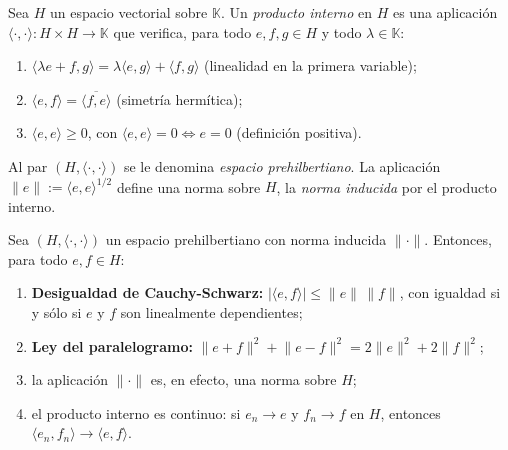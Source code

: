 \begin{Definicion}
\label{ch:preliminares:def:productoInterno}

Sea $H$ un espacio vectorial sobre $\mathbb{K}$. Un \textit{producto interno} en
$H$ es una aplicación $\langle \cdot, \cdot \rangle : H \times H \rightarrow \mathbb{K}$
que verifica, para todo $e, f, g \in H$ y todo $\lambda \in \mathbb{K}$:

\begin{enumerate}
    \item $\langle \lambda e + f, g \rangle = \lambda \langle e, g \rangle + \langle f, g \rangle$ (linealidad en la primera variable);
    \item $\langle e, f \rangle = \overline{\langle f, e \rangle}$ (simetría hermítica);
    \item $\langle e, e \rangle \geq 0$, con $\langle e, e \rangle = 0 \iff e = 0$ (definición positiva).
\end{enumerate}

Al par $(H, \langle \cdot, \cdot \rangle)$ se le denomina \textit{espacio
prehilbertiano}. La aplicación $\lVert e \rVert := \langle e, e \rangle^{1/2}$
define una norma sobre $H$, la \textit{norma inducida} por el producto interno.
\end{Definicion}

\begin{Proposicion}
\label{ch:preliminares:prop:propProductoInterno}

Sea $(H, \langle \cdot, \cdot \rangle)$ un espacio prehilbertiano con norma
inducida $\lVert \cdot \rVert$. Entonces, para todo $e, f \in H$:

\begin{enumerate}
    \item \textbf{Desigualdad de Cauchy-Schwarz:} $|\langle e, f \rangle| \leq \lVert e \rVert \, \lVert f \rVert$, con igualdad si y sólo si $e$ y $f$ son linealmente dependientes;

    \item \textbf{Ley del paralelogramo:} $\lVert e + f \rVert^2 + \lVert e - f \rVert^2 = 2\lVert e \rVert^2 + 2\lVert f \rVert^2$;

    \item la aplicación $\lVert \cdot \rVert$ es, en efecto, una norma sobre $H$;

    \item el producto interno es continuo: si $e_n \rightarrow e$ y
    $f_n \rightarrow f$ en $H$, entonces $\langle e_n, f_n \rangle \rightarrow \langle e, f \rangle$.
\end{enumerate}
\end{Proposicion}

